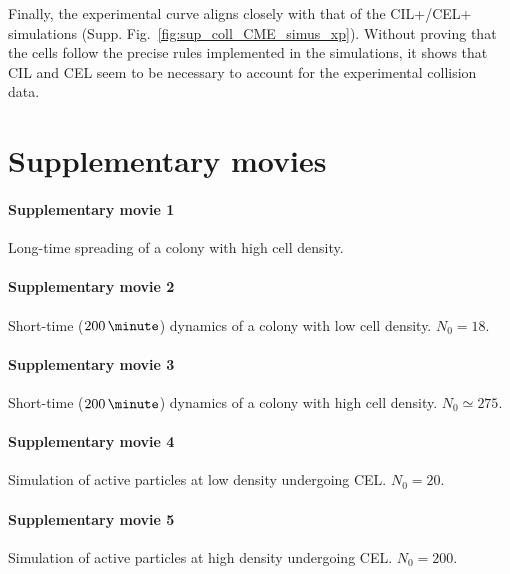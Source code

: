 \documentclass[11pt, twocolumn]{article}
\begin{document}
Finally, the experimental curve aligns closely with that of the
CIL+/CEL+ simulations
(Supp. Fig.~\ref{fig:sup_coll_CME_simus_xp}). Without proving that the
cells follow the precise rules implemented in the simulations, it
shows that CIL and CEL seem to be necessary to account for the
experimental collision data.


\section*{Supplementary movies}

\paragraph{Supplementary movie 1}
Long-time spreading of a colony with high cell density.

\paragraph{Supplementary movie 2}
Short-time ($200\,\minute$) dynamics of a colony with low cell density. $N_0=18$.

\paragraph{Supplementary movie 3}
Short-time ($200\,\minute$) dynamics of a colony with high cell density. $N_0\simeq275$.

\paragraph{Supplementary movie 4}
Simulation of active particles at low density undergoing CEL. $N_0=20$.

\paragraph{Supplementary movie 5}
Simulation of active particles at high density undergoing CEL. $N_0=200$.
\end{document}
